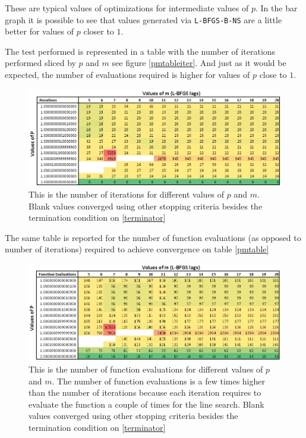 These are typical values of optimizations for intermediate values of $p$. In the bar graph it is possible to see that values generated via \texttt{L-BFGS-B-NS} are a little better for values of $p$ closer to $1$. 

The test performed is represented in a table with the number of iterations performed sliced by $p$ and $m$ see figure \eqref{pmtableiter}. And just as it would be expected, the number of evaluations required is higher for values of $p$ close to $1$.

\begin{figure}
\begin{center}
\includegraphics[scale=0.55]{Figures/Niterations.PNG}
\caption[Number of function iterations for different values of $p$ and $m$ in the solution of Modified Rosenbrock]{This is the number of iterations for different values of $p$ and $m$. Blank values converged using other stopping criteria besides the termination condition on \eqref{terminator}}
\label{pmtableiter}
\end{center}
\end{figure}

The same table is reported for the number of function evaluations (as opposed to number of iterations) required to achieve convergence on table \eqref{pmtable}

\begin{figure}
\begin{center}
\includegraphics[scale=0.55]{Figures/Nevaluations.PNG}
\caption[Number of function evaluations for different values of $p$ and $m$ in the solution of Modified Rosenbrock]{This is the number of function evaluations for different values of $p$ and $m$. The number of function evaluations is a few times higher than the number of iterations because each iteration requires to evaluate the function a couple of times for the line search. Blank values converged using other stopping criteria besides the termination condition on \eqref{terminator}}
\label{pmtable}
\end{center}
\end{figure}

